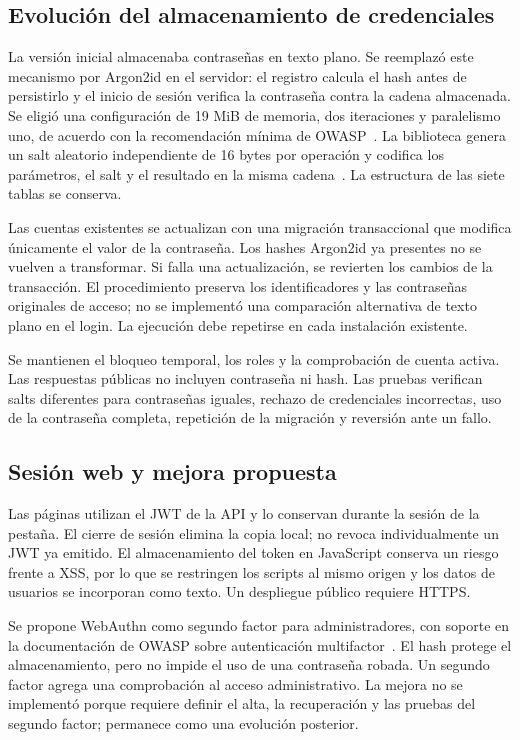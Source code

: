 \subsection{Evolución del almacenamiento de credenciales}
La versión inicial almacenaba contraseñas en texto plano. Se reemplazó este mecanismo por Argon2id en el servidor: el registro calcula el hash antes de persistirlo y el inicio de sesión verifica la contraseña contra la cadena almacenada. Se eligió una configuración de 19 MiB de memoria, dos iteraciones y paralelismo uno, de acuerdo con la recomendación mínima de OWASP~\cite{owasp-passwords}. La biblioteca genera un salt aleatorio independiente de 16 bytes por operación y codifica los parámetros, el salt y el resultado en la misma cadena~\cite{node-argon2}. La estructura de las siete tablas se conserva.

Las cuentas existentes se actualizan con una migración transaccional que modifica únicamente el valor de la contraseña. Los hashes Argon2id ya presentes no se vuelven a transformar. Si falla una actualización, se revierten los cambios de la transacción. El procedimiento preserva los identificadores y las contraseñas originales de acceso; no se implementó una comparación alternativa de texto plano en el login. La ejecución debe repetirse en cada instalación existente.

Se mantienen el bloqueo temporal, los roles y la comprobación de cuenta activa. Las respuestas públicas no incluyen contraseña ni hash. Las pruebas verifican salts diferentes para contraseñas iguales, rechazo de credenciales incorrectas, uso de la contraseña completa, repetición de la migración y reversión ante un fallo.

\subsection{Sesión web y mejora propuesta}
Las páginas utilizan el JWT de la API y lo conservan durante la sesión de la pestaña. El cierre de sesión elimina la copia local; no revoca individualmente un JWT ya emitido. El almacenamiento del token en JavaScript conserva un riesgo frente a XSS, por lo que se restringen los scripts al mismo origen y los datos de usuarios se incorporan como texto. Un despliegue público requiere HTTPS.

Se propone WebAuthn como segundo factor para administradores, con soporte en la documentación de OWASP sobre autenticación multifactor~\cite{owasp-mfa}. El hash protege el almacenamiento, pero no impide el uso de una contraseña robada. Un segundo factor agrega una comprobación al acceso administrativo. La mejora no se implementó porque requiere definir el alta, la recuperación y las pruebas del segundo factor; permanece como una evolución posterior.
